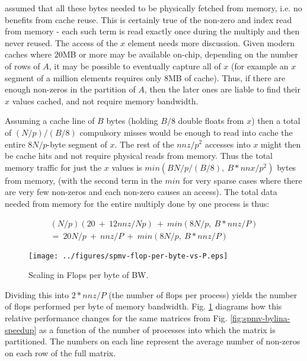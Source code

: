 \cite{techbib:marjanovic2014performance} assumed that all these bytes needed to be physically fetched from memory, i.e. no benefits from cache reuse. This is certainly true of the non-zero and index read from memory - each such term is read exactly once during the multiply and then never reused. The access of the $x$ element needs more discussion. Given modern caches where 20MB or more may be available on-chip, depending on the number of rows of $A$, it may be possible to eventually capture all of $x$ (for example an $x$ segment of a million elements requires only 8MB of cache). Thus, if there are enough non-zeros in the partition of $A$, then the later ones are liable to find their $x$ values cached, and not require memory bandwidth.

Assuming a cache line of $B$ bytes (holding $B/8$ double floats from $x$) then a total of $(N/p)/(B/8)$ compulsory misses would be enough to read into cache the entire $8N/p$-byte segment of $x$. The rest of the $nnz/p^2$ accesses into $x$ might then be cache hits and not require physical reads from memory. Thus the total memory traffic for just the $x$ values is $min(BN/p/(B/8),~B*nnx/p^2)$ bytes from memory, (with the second term in the $min$ for very sparse cases where there are very few non-zeros and each non-zero causes an access). The total data needed from memory for the entire multiply done by one process is thus:

\begin{eqnarray}\label{eq:1process}
(N/p)(20~+~12nnz/Np)~+~min(8N/p,~B*nnz/P)  \\
=~20N/p~+~nnz/P~+~min(8N/p,~B*nnz/P) 
\end{eqnarray}

\begin{figure}\begin{centering}
\texttt{[image: ../figures/spmv-flop-per-byte-vs-P.eps]}
\caption{Scaling in Flops per byte of BW.}
\label{fig:spmv-flop-per-byte-vs-P}
\end{centering}\end{figure}


Dividing this into $2*nnz/P$ (the number of flops per process) yields the number of flops performed per byte of memory bandwidth. Fig. \ref{fig:spmv-flop-per-byte-vs-P} diagrams how this relative performance changes for the same matrices from Fig. \ref{fig:spmv-bylina-speedup} as a function of the number of processes into which the matrix is partitioned. The numbers on each line represent the average number of non-zeros on each row of the full matrix.


